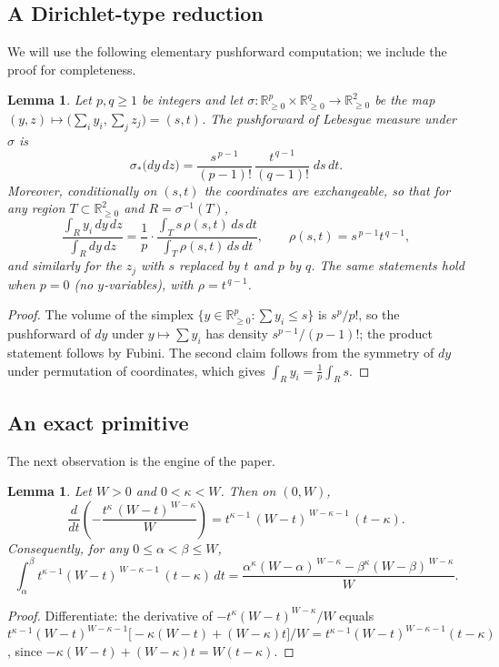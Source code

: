 \documentclass[11pt]{amsart}
\newtheorem{lemma}[theorem]{Lemma}
\theoremstyle{definition}
\theoremstyle{remark}
\newcommand{\RR}{\mathbb{R}}
\begin{document}
\subsection{A Dirichlet-type reduction}
We will use the following elementary pushforward computation; we
include the proof for completeness.

\begin{lemma}\label{lem:reduction}
Let $p,q\ge1$ be integers and let
$\sigma\colon\RR_{\ge0}^{p}\times\RR_{\ge0}^{q}\to\RR_{\ge0}^2$ be the
map $(y,z)\mapsto\bigl(\sum_i y_i,\sum_j z_j\bigr)=(s,t)$. The
pushforward of Lebesgue measure under $\sigma$ is
\[
\sigma_*\bigl(dy\,dz\bigr)
=\frac{s^{\,p-1}}{(p-1)!}\,\frac{t^{\,q-1}}{(q-1)!}\;ds\,dt .
\]
Moreover, conditionally on $(s,t)$ the coordinates are exchangeable, so
that for any region $T\subset\RR_{\ge0}^2$ and $R=\sigma^{-1}(T)$,
\[
\frac{\int_R y_i\,dy\,dz}{\int_R dy\,dz}
=\frac{1}{p}\cdot
\frac{\int_T s\,\rho(s,t)\,ds\,dt}{\int_T \rho(s,t)\,ds\,dt},
\qquad
\rho(s,t)=s^{\,p-1}t^{\,q-1},
\]
and similarly for the $z_j$ with $s$ replaced by $t$ and $p$ by $q$.
The same statements hold when $p=0$ (no $y$-variables), with
$\rho=t^{\,q-1}$.
\end{lemma}

\begin{proof}
The volume of the simplex $\{y\in\RR^p_{\ge0}:\sum y_i\le s\}$ is
$s^p/p!$, so the pushforward of $dy$ under $y\mapsto\sum y_i$ has
density $s^{p-1}/(p-1)!$; the product statement follows by Fubini. The
second claim follows from the symmetry of $dy$ under permutation of
coordinates, which gives $\int_R y_i = \frac1p\int_R s$.
\end{proof}

\subsection{An exact primitive}
The next observation is the engine of the paper.

\begin{lemma}\label{lem:primitive}
Let $W>0$ and $0<\kappa<W$. Then on $(0,W)$,
\[
\frac{d}{dt}\left(-\frac{t^{\kappa}\,(W-t)^{\,W-\kappa}}{W}\right)
= t^{\kappa-1}\,(W-t)^{\,W-\kappa-1}\,(t-\kappa).
\]
Consequently, for any $0\le\alpha<\beta\le W$,
\[
\int_\alpha^\beta t^{\kappa-1}(W-t)^{\,W-\kappa-1}\,(t-\kappa)\,dt
=\frac{\alpha^{\kappa}(W-\alpha)^{\,W-\kappa}
-\beta^{\kappa}(W-\beta)^{\,W-\kappa}}{W}.
\]
\end{lemma}

\begin{proof}
Differentiate: the derivative of $-t^{\kappa}(W-t)^{W-\kappa}/W$ equals
$t^{\kappa-1}(W-t)^{W-\kappa-1}\bigl[-\kappa(W-t)+(W-\kappa)t\bigr]/W
=t^{\kappa-1}(W-t)^{W-\kappa-1}(t-\kappa)$, since
$-\kappa(W-t)+(W-\kappa)t=W(t-\kappa)$.
\end{proof}
\end{document}
